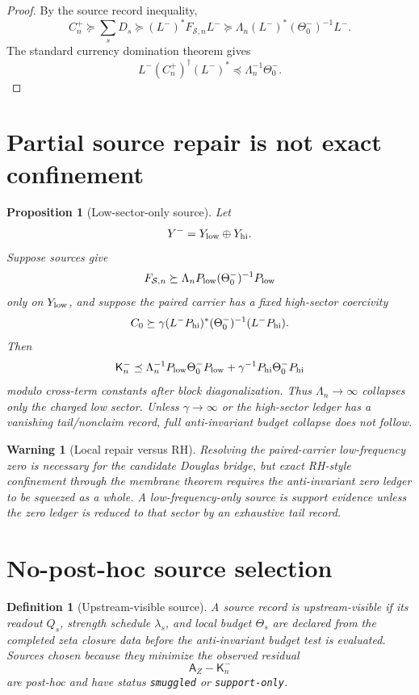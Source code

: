 \documentclass[11pt]{article}
\newtheorem{proposition}{Proposition}
\newtheorem{definition}{Definition}
\newtheorem{warning}{Warning}
\newcommand{\K}{\mathsf K}
\newcommand{\pre}{\preceq}
\newcommand{\suc}{\succeq}
\begin{document}
\begin{proof}
By the source record inequality,
\[
  C_n^+\suc \sum_sD_s\suc (L^-)^*F_{\mathcal S,n}L^-\suc
  \Lambda_n (L^-)^*(\Theta_0^-)^{-1}L^-.
\]
The standard currency domination theorem gives
\[
  L^-(C_n^+)^\dagger(L^-)^*\pre \Lambda_n^{-1}\Theta_0^-.
\]
\end{proof}

\section{Partial source repair is not exact confinement}
\begin{proposition}[Low-sector-only source]
Let
\[
  Y^-=Y_{\rm low}\oplus Y_{\rm hi}.
\]
Suppose sources give
\[
  F_{\mathcal S,n}\suc \Lambda_nP_{\rm low}(\Theta_0^-)^{-1}P_{\rm low}
\]
only on $Y_{\rm low}$, and suppose the paired carrier has a fixed high-sector coercivity
\[
  C_0\suc \gamma (L^-P_{\rm hi})^*(\Theta_0^-)^{-1}(L^-P_{\rm hi}).
\]
Then
\[
  \K_n^-\pre \Lambda_n^{-1}P_{\rm low}\Theta_0^-P_{\rm low}+\gamma^{-1}P_{\rm hi}\Theta_0^-P_{\rm hi}
\]
modulo cross-term constants after block diagonalization.  Thus $\Lambda_n\to\infty$ collapses only the charged low sector.  Unless $\gamma\to\infty$ or the high-sector ledger has a vanishing tail/nonclaim record, full anti-invariant budget collapse does not follow.
\end{proposition}

\begin{warning}[Local repair versus RH]
Resolving the paired-carrier low-frequency zero is necessary for the candidate Douglas bridge, but exact RH-style confinement through the membrane theorem requires the anti-invariant zero ledger to be squeezed as a whole.  A low-frequency-only source is support evidence unless the zero ledger is reduced to that sector by an exhaustive tail record.
\end{warning}

\section{No-post-hoc source selection}
\begin{definition}[Upstream-visible source]
A source record is upstream-visible if its readout $Q_s$, strength schedule $\lambda_s$, and local budget $\Theta_s$ are declared from the completed zeta closure data before the anti-invariant budget test is evaluated.  Sources chosen because they minimize the observed residual
\[
  \mathsf A_Z-\mathsf K_n^-
\]
are post-hoc and have status \texttt{smuggled} or \texttt{support-only}.
\end{definition}
\end{document}
